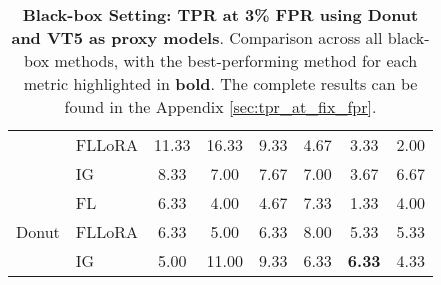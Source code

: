\begin{table}[t]
\begin{minipage}{0.39\textwidth}
{\begin{tabular}[]{clcccccc}
            & FLLoRA & {11.33} & 16.33  & 9.33  & 4.67  & 3.33 & 2.00 \\
            & IG & 8.33  & 7.00 & 7.67  & 7.00 & 3.67 & 6.67 \\
            \cmidrule(l){1-8}
            \multirow{3}{*}{Donut} & FL  & 6.33  & 4.00  & 4.67 & 7.33  & 1.33  & 4.00 \\
            & FLLoRA & 6.33  & 5.00  & 6.33  & 8.00  & 5.33 & 5.33 \\
            & IG  & 5.00 & 11.00  & 9.33 &  6.33  & \textbf{6.33}& 4.33 \\
            \bottomrule
            \end{tabular}
        }
        \caption{\textbf{Black-box Setting: TPR at 3\% FPR using Donut and VT5 as proxy models}. Comparison across all black-box methods, with the best-performing method for each metric highlighted in \textbf{bold}. The complete results can be found in the Appendix \ref{sec:tpr_at_fix_fpr}.}
        \label{tab:tpr@fpr_main_blackbox}    
    \end{minipage}
\end{table}


